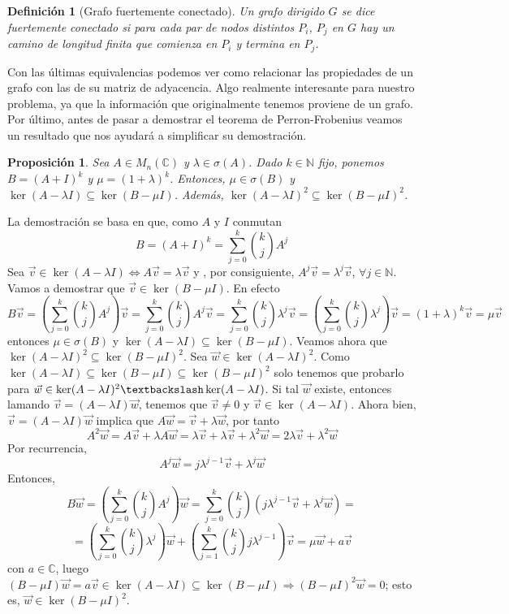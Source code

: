 \documentclass[size=a4, parskip=half, titlepage=false, toc=flat, toc=bib, 12pt]{scrartcl}
\makeatletter
\renewenvironment{proof}[1][\proofname] {\par\pushQED{\qed}\normalfont\topsep6\p@\@plus6\p@\relax\trivlist\item[\hskip\labelsep\itshape\tgpaella#1\@addpunct{.}]\ignorespaces}{\popQED\endtrivlist\@endpefalse}
\theoremstyle{theorem-style}
\newtheorem{nprop}{Proposición}[section]
\theoremstyle{definition-style}
\newtheorem{ndef}{Definición}[section]
\theoremstyle{remark-style}
\theoremstyle{example-style}
\theoremstyle{definition-style}
\theoremstyle{remark-style}
\makeatother
\begin{document}
\begin{ndef}[Grafo fuertemente conectado]
Un grafo dirigido $G$ se dice fuertemente conectado si para cada par de nodos distintos $P_i$, $P_j$ en $G$ hay un camino de longitud finita que comienza en $P_i$ y termina en $P_j$.
\end{ndef}

Con las últimas equivalencias podemos ver como relacionar las propiedades de un grafo con las de su matriz de adyacencia. Algo realmente interesante para nuestro problema, ya que la información que originalmente tenemos proviene de un grafo. Por último, antes de pasar a demostrar el teorema de Perron-Frobenius veamos un resultado que nos ayudará a simplificar su demostración.

\begin{nprop}
\label{antes}
Sea $A\in M_n(\mathbb{C})$ y $\lambda \in \sigma(A)$. Dado $k \in \mathbb{N}$ fijo, ponemos $B = (A + I)^k$ y $\mu = (1 + \lambda)^k$. Entonces, $\mu \in \sigma(B)$ y $\ker(A - \lambda I) \subseteq \ker(B - \mu I)$. Además, $\ker(A - \lambda I)^2 \subseteq \ker(B - \mu I)^2$.
\end{nprop}
\begin{proof}
La demostración se basa en que, como $A$ y $I$ conmutan $$B = (A + I)^k = \sum_{j = 0}^k {k \choose j} A^j $$
Sea $\vec{v} \in \ker(A- \lambda I) \Leftrightarrow A \vec{v} = \lambda \vec{v}$ y , por consiguiente, $A^j \vec{v} = \lambda^j \vec{v}$, $\forall j \in \mathbb{N}$.
Vamos a demostrar que $\vec{v} \in \ker(B - \mu I)$. En efecto
$$B \vec{v} = \left( \sum_{j = 0}^k {k \choose j} A^j \right) \vec{v} = \sum_{j=0}^k {k \choose j} A^j \vec{v} = \sum_{j = 0}^k {k \choose j} \lambda^j \vec{v} = \left(\sum_{j = 0}^k {k \choose j} \lambda^j \right) \vec{v} = (1 + \lambda)^k \vec{v} = \mu \vec{v}$$
entonces $\mu \in \sigma(B)$ y $\ker(A - \lambda I) \subseteq \ker(B - \mu I)$.
Veamos ahora que $\ker(A - \lambda I)^2 \subseteq \ker(B - \mu I)^2$.
Sea $\vec{w} \in \ker(A - \lambda I)^2$. Como $\ker(A - \lambda I) \subseteq \ker(B - \mu I) \subseteq \ker(B - \mu I)^2$ solo tenemos que probarlo para $\vec{w} \in \ker(A - \lambda I)^2 \textbackslash \ker(A -\lambda I)$. Si tal $\vec{w}$ existe, entonces lamando $\vec{v} = (A - \lambda I)\vec{w}$, tenemos que   $\vec{v} \neq 0$ y $\vec{v} \in \ker(A - \lambda I)$.
Ahora bien, $\vec{v} = (A - \lambda I)\vec{w}$ implica que $A \vec{w} = \vec{v} + \lambda \vec{w}$, por tanto $$A^2 \vec{w} = A \vec{v} + \lambda A \vec{w} = \lambda \vec{v} + \lambda \vec{v} + \lambda^2 \vec{w} = 2 \lambda \vec{v} + \lambda^2 \vec{w}$$
Por recurrencia,
$$A^j \vec{w} = j \lambda^{j - 1} \vec{v} + \lambda^j \vec{w} $$
Entonces,
$$B \vec{w} = \left( \sum_{j = 0}^k {k \choose j} A^j \right)\vec{w} = \sum_{j = 0}^k {k \choose j} \left( j \lambda^{j - 1} \vec{v} + \lambda^j \vec{w} \right) =$$ $$= \left( \sum_{j=0}^k {k \choose j} \lambda^j \right) \vec{w} + \left(  \sum_{j = 1}^k {k \choose j} j \lambda^{j - 1} \right) \vec{v}  = \mu \vec{w} + a \vec{v}$$
con $a \in \mathbb{C}$, luego $(B - \mu I)\vec{w} = a \vec{v} \in \ker(A - \lambda I) \subseteq \ker(B - \mu I) \Rightarrow (B - \mu I)^2 \vec{w} = 0$; esto es, $\vec{w} \in \ker(B - \mu I)^2$.
\end{proof}
\end{document}
